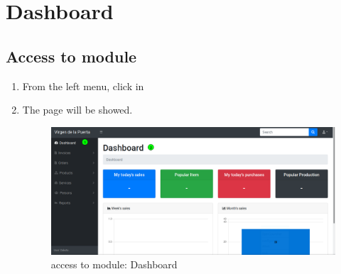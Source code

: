 \documentclass[a4paper,11pt]{refart}
\begin{document}
\section{Dashboard}
\subsection{Access to module}
\begin{enumerate}
	\item From the left menu, click in  
	\item The page will be showed.
	\begin{figure}[H]\centering
		\includegraphics[width=\textwidth]{images/dashboard-access.png}
		\caption{access to module: Dashboard}
		\label{fig:dashboard-access}
	\end{figure}
\end{enumerate}
\end{document}

